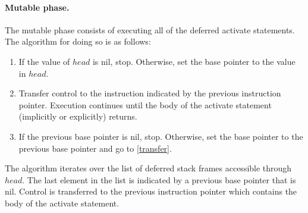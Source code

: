 \paragraph{Mutable phase.}
The mutable phase consists of executing all of the deferred activate statements.
The algorithm for doing so is as follows:
\begin{enumerate}
\item If the value of $head$ is nil, stop.  Otherwise, set the base pointer to the value in $head$.
\item Transfer control to the instruction indicated by the previous instruction pointer\label{transfer}.  Execution continues until the body of the activate statement (implicitly or explicitly) returns.
\item If the previous base pointer is nil, stop.  Otherwise, set the base pointer to the previous base pointer and go to \ref{transfer}.
\end{enumerate}

The algorithm iterates over the list of deferred stack frames accessible through $head$.
The last element in the list is indicated by a previous base pointer that is nil.
Control is transferred to the previous instruction pointer which contains the body of the activate statement.

